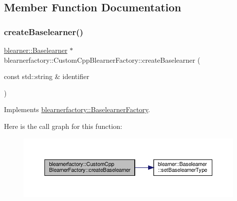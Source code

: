 \subsection{Member Function Documentation}
\mbox{\label{classblearnerfactory_1_1_custom_cpp_blearner_factory_ac98fae043e6822605261c7c6f7125e8c}} 
\subsubsection{\texorpdfstring{create\+Baselearner()}{createBaselearner()}}
{\footnotesize\ttfamily \mbox{\hyperlink{classblearner_1_1_baselearner}{blearner\+::\+Baselearner}} $\ast$ blearnerfactory\+::\+Custom\+Cpp\+Blearner\+Factory\+::create\+Baselearner (\begin{DoxyParamCaption}\item[{const std\+::string \&}]{identifier }\end{DoxyParamCaption})\hspace{0.3cm}{\ttfamily [virtual]}}



Implements \mbox{\hyperlink{classblearnerfactory_1_1_baselearner_factory_ac3584a20a84834099a15908690b837bb}{blearnerfactory\+::\+Baselearner\+Factory}}.

Here is the call graph for this function\+:\nopagebreak
\begin{figure}[H]
\begin{center}
\leavevmode
\includegraphics[width=350pt]{classblearnerfactory_1_1_custom_cpp_blearner_factory_ac98fae043e6822605261c7c6f7125e8c_cgraph}
\end{center}
\end{figure}
\mbox{\label{classblearnerfactory_1_1_custom_cpp_blearner_factory_a29cc0d142660d6e52245c264f71dd651}} 
